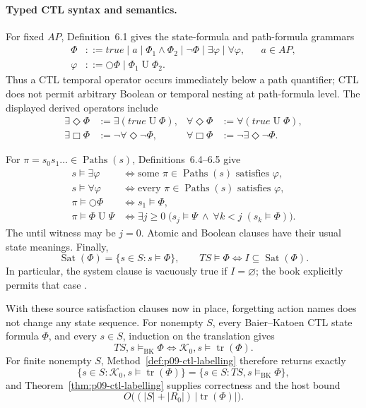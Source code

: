 \paragraph{Typed CTL syntax and semantics.}
For fixed \(AP\), Definition~6.1 gives the state-formula and path-formula
grammars
\[
\begin{aligned}
 \Phi&::=true\mid a\mid\Phi_1\land\Phi_2\mid\neg\Phi
          \mid\exists\varphi\mid\forall\varphi,
          &&a\in AP,\\
 \varphi&::=\bigcirc\Phi\mid\Phi_1\mathbin{U}\Phi_2.
\end{aligned}
\]
Thus a CTL temporal operator occurs immediately below a path quantifier; CTL
does not permit arbitrary Boolean or temporal nesting at path-formula level.
The displayed derived operators include
\[
\begin{aligned}
 \exists\Diamond\Phi&:=\exists(true\mathbin{U}\Phi),&
 \forall\Diamond\Phi&:=\forall(true\mathbin{U}\Phi),\\
 \exists\Box\Phi&:=\neg\forall\Diamond\neg\Phi,&
 \forall\Box\Phi&:=\neg\exists\Diamond\neg\Phi.
\end{aligned}
\]

For \(\pi=s_0s_1\ldots\in\operatorname{Paths}(s)\), Definitions~6.4--6.5
give
\[
\begin{aligned}
 s\models\exists\varphi
   &\iff \text{some }\pi\in\operatorname{Paths}(s)\text{ satisfies }\varphi,\\
 s\models\forall\varphi
   &\iff \text{every }\pi\in\operatorname{Paths}(s)\text{ satisfies }\varphi,\\
 \pi\models\bigcirc\Phi
   &\iff s_1\models\Phi,\\
 \pi\models\Phi\mathbin{U}\Psi
   &\iff \exists j\ge0\;\bigl(s_j\models\Psi\ \land\
      \forall k<j\;(s_k\models\Phi)\bigr).
\end{aligned}
\]
The until witness may be \(j=0\).  Atomic and Boolean clauses have their usual
state meanings.  Finally,
\[
 \operatorname{Sat}(\Phi)=\{s\in S:s\models\Phi\},
 \qquad
 TS\models\Phi\iff I\subseteq\operatorname{Sat}(\Phi).
\]
In particular, the system clause is vacuously true if \(I=\varnothing\); the
book explicitly permits that case \cite[defs.~6.1, 6.4--6.5;
pp.~317--321]{BaierKatoen2008}.

With these source satisfaction clauses now in place, forgetting action names
does not change any state sequence.  For nonempty \(S\), every Baier--Katoen
CTL state formula \(\Phi\), and every \(s\in S\), induction on the translation
gives
\[
 TS,s\models_{\mathrm{BK}}\Phi
 \iff
 \mathcal K_0,s\models\operatorname{tr}(\Phi).
\]
For finite nonempty \(S\), Method~\ref{def:p09-ctl-labelling} therefore
returns exactly
\[
 \{s\in S:\mathcal K_0,s\models\operatorname{tr}(\Phi)\}
 =\{s\in S:TS,s\models_{\mathrm{BK}}\Phi\},
\]
and Theorem~\ref{thm:p09-ctl-labelling} supplies correctness and the host bound
\[
 O\bigl((|S|+|R_0|)\,|\operatorname{tr}(\Phi)|\bigr).
\]

